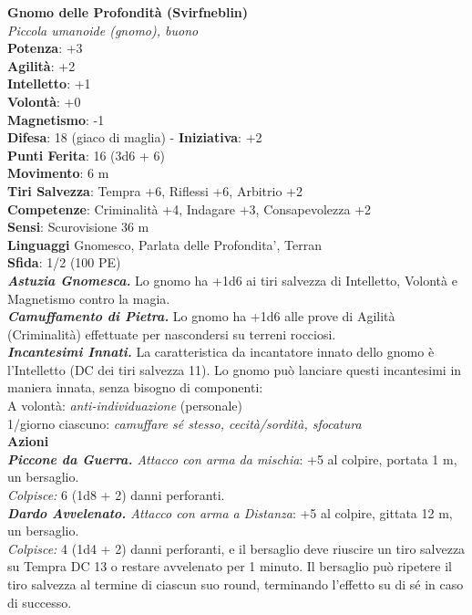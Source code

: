 \begin{multicols}{2}
\medskip\textbf{Gnomo delle Profondità (Svirfneblin)} \\
\emph{Piccola umanoide (gnomo), buono}\\
\textbf{Potenza}: +3\\
\textbf{Agilità}: +2\\
\textbf{Intelletto}: +1\\
\textbf{Volontà}: +0\\
\textbf{Magnetismo}: -1\\
\textbf{Difesa}: 18 (giaco di maglia) - \textbf{Iniziativa}: +2\\
\textbf{Punti Ferita}: 16 (3d6 + 6)\\
\textbf{Movimento}: 6 m\\
\textbf{Tiri Salvezza}: Tempra +6, Riflessi +6, Arbitrio +2\\
\textbf{Competenze}: Criminalità +4, Indagare +3, Consapevolezza +2\\
\textbf{Sensi}: Scurovisione 36 m\\
\textbf{Linguaggi} Gnomesco, Parlata delle Profondita', Terran\\
\textbf{Sfida}: 1/2 (100 PE)\smallskip\\
\emph{\textbf{Astuzia Gnomesca.}} Lo gnomo ha +1d6 ai tiri salvezza di Intelletto, Volontà e Magnetismo contro la magia.\\
\emph{\textbf{Camuffamento di Pietra.}} Lo gnomo ha +1d6 alle prove di Agilità (Criminalità) effettuate per nascondersi su terreni rocciosi.\\
\emph{\textbf{Incantesimi Innati.}} La caratteristica da incantatore innato dello gnomo è l'Intelletto (DC dei tiri salvezza 11). Lo gnomo può lanciare questi incantesimi in maniera innata, senza bisogno di componenti:\\
A volontà: \emph{anti-individuazione} (personale)\\
1/giorno ciascuno: \emph{camuffare sé stesso, cecità/sordità, sfocatura}\\
\smallskip\textbf{Azioni}\\
\emph{\textbf{Piccone da Guerra.} Attacco con arma da mischia}: +5 al colpire, portata 1 m, un bersaglio.\\
\emph{Colpisce:} 6 (1d8 + 2) danni perforanti.\\
\emph{\textbf{Dardo Avvelenato.} Attacco con arma a Distanza}: +5 al colpire, gittata 12 m, un bersaglio.\\
\emph{Colpisce:} 4 (1d4 + 2) danni perforanti, e il bersaglio deve riuscire un tiro salvezza su Tempra DC  13 o restare avvelenato per 1 minuto. Il bersaglio può ripetere il tiro salvezza al termine di ciascun suo round, terminando l'effetto su di sé in caso di successo.\\

\end{multicols}

